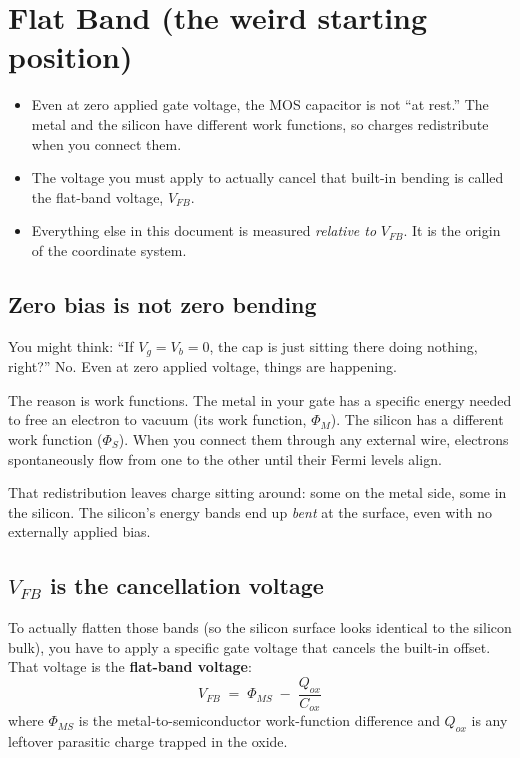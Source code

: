 \documentclass[11pt]{article}
\begin{document}
\section{Flat Band (the weird starting position)}

\begin{tldr}
\begin{itemize}[leftmargin=*]
\item Even at zero applied gate voltage, the MOS capacitor is not ``at rest.'' The metal and the silicon have different work functions, so charges redistribute when you connect them.
\item The voltage you must apply to actually cancel that built-in bending is called the flat-band voltage, $V_{FB}$.
\item Everything else in this document is measured \emph{relative to} $V_{FB}$. It is the origin of the coordinate system.
\end{itemize}
\end{tldr}

\subsection{Zero bias is not zero bending}

You might think: ``If $V_g = V_b = 0$, the cap is just sitting there doing nothing, right?'' No. Even at zero applied voltage, things are happening.

The reason is work functions. The metal in your gate has a specific energy needed to free an electron to vacuum (its work function, $\Phi_M$). The silicon has a different work function ($\Phi_S$). When you connect them through any external wire, electrons spontaneously flow from one to the other until their Fermi levels align.

That redistribution leaves charge sitting around: some on the metal side, some in the silicon. The silicon's energy bands end up \emph{bent} at the surface, even with no externally applied bias.

\subsection{$V_{FB}$ is the cancellation voltage}

To actually flatten those bands (so the silicon surface looks identical to the silicon bulk), you have to apply a specific gate voltage that cancels the built-in offset. That voltage is the \textbf{flat-band voltage}:
\begin{equation}
V_{FB} \;=\; \Phi_{MS} \;-\; \frac{Q_{ox}}{C_{ox}}
\end{equation}
where $\Phi_{MS}$ is the metal-to-semiconductor work-function difference and $Q_{ox}$ is any leftover parasitic charge trapped in the oxide.
\end{document}
